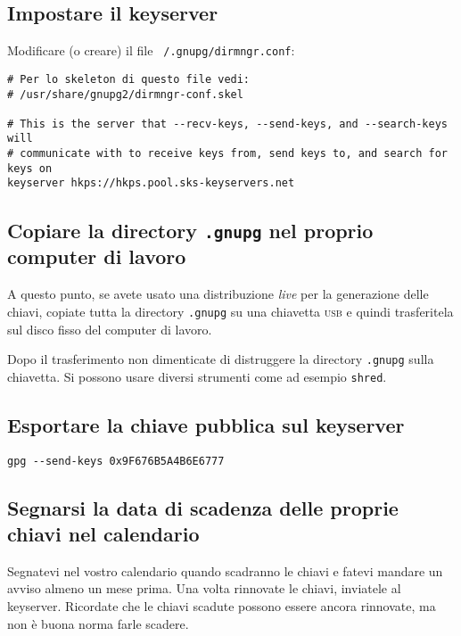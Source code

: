\documentclass[a4paper,10pt]{article}
\begin{document}
\subsection{Impostare il keyserver}

Modificare (o creare) il file \texttt{~/.gnupg/dirmngr.conf}:

\begin{lstlisting}
# Per lo skeleton di questo file vedi:
# /usr/share/gnupg2/dirmngr-conf.skel

# This is the server that --recv-keys, --send-keys, and --search-keys will
# communicate with to receive keys from, send keys to, and search for keys on
keyserver hkps://hkps.pool.sks-keyservers.net
\end{lstlisting}

\subsection{Copiare la directory \texttt{.gnupg} nel proprio computer di lavoro}

A questo punto, se avete usato una distribuzione \textit{live} per la generazione delle chiavi, copiate tutta la directory \texttt{.gnupg} su una chiavetta \textsc{usb} e quindi trasferitela sul disco fisso del computer di lavoro.

Dopo il trasferimento non dimenticate di distruggere la directory \texttt{.gnupg} sulla chiavetta. Si possono usare diversi strumenti come ad esempio \texttt{shred}.

\subsection{Esportare la chiave pubblica sul keyserver}

\begin{lstlisting}
gpg --send-keys 0x9F676B5A4B6E6777
\end{lstlisting}

\subsection{Segnarsi la data di scadenza delle proprie chiavi nel calendario}

Segnatevi nel vostro calendario quando scadranno le chiavi e fatevi mandare un avviso almeno un mese prima. Una volta rinnovate le chiavi, inviatele al keyserver. Ricordate che le chiavi scadute possono essere ancora rinnovate, ma non è buona norma farle scadere.
\end{document}
